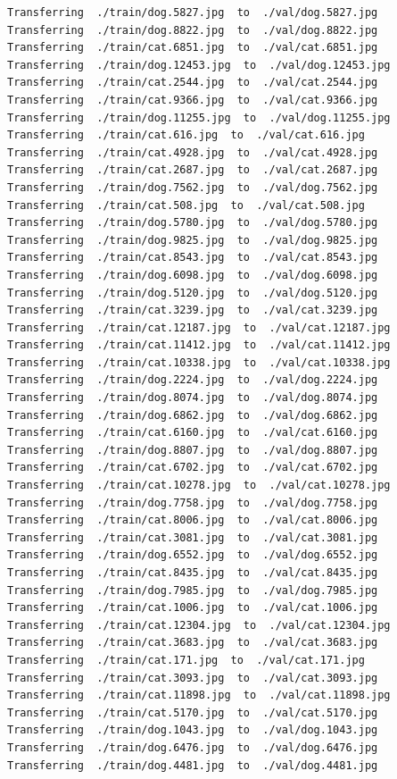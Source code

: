 \documentclass[]{book}
\theoremstyle{definition}
\theoremstyle{definition}
\theoremstyle{definition}
\theoremstyle{remark}
\begin{document}
\begin{verbatim}
Transferring  ./train/dog.5827.jpg  to  ./val/dog.5827.jpg
Transferring  ./train/dog.8822.jpg  to  ./val/dog.8822.jpg
Transferring  ./train/cat.6851.jpg  to  ./val/cat.6851.jpg
Transferring  ./train/dog.12453.jpg  to  ./val/dog.12453.jpg
Transferring  ./train/cat.2544.jpg  to  ./val/cat.2544.jpg
Transferring  ./train/cat.9366.jpg  to  ./val/cat.9366.jpg
Transferring  ./train/dog.11255.jpg  to  ./val/dog.11255.jpg
Transferring  ./train/cat.616.jpg  to  ./val/cat.616.jpg
Transferring  ./train/cat.4928.jpg  to  ./val/cat.4928.jpg
Transferring  ./train/cat.2687.jpg  to  ./val/cat.2687.jpg
Transferring  ./train/dog.7562.jpg  to  ./val/dog.7562.jpg
Transferring  ./train/cat.508.jpg  to  ./val/cat.508.jpg
Transferring  ./train/dog.5780.jpg  to  ./val/dog.5780.jpg
Transferring  ./train/dog.9825.jpg  to  ./val/dog.9825.jpg
Transferring  ./train/cat.8543.jpg  to  ./val/cat.8543.jpg
Transferring  ./train/dog.6098.jpg  to  ./val/dog.6098.jpg
Transferring  ./train/dog.5120.jpg  to  ./val/dog.5120.jpg
Transferring  ./train/cat.3239.jpg  to  ./val/cat.3239.jpg
Transferring  ./train/cat.12187.jpg  to  ./val/cat.12187.jpg
Transferring  ./train/cat.11412.jpg  to  ./val/cat.11412.jpg
Transferring  ./train/cat.10338.jpg  to  ./val/cat.10338.jpg
Transferring  ./train/dog.2224.jpg  to  ./val/dog.2224.jpg
Transferring  ./train/dog.8074.jpg  to  ./val/dog.8074.jpg
Transferring  ./train/dog.6862.jpg  to  ./val/dog.6862.jpg
Transferring  ./train/cat.6160.jpg  to  ./val/cat.6160.jpg
Transferring  ./train/dog.8807.jpg  to  ./val/dog.8807.jpg
Transferring  ./train/cat.6702.jpg  to  ./val/cat.6702.jpg
Transferring  ./train/cat.10278.jpg  to  ./val/cat.10278.jpg
Transferring  ./train/dog.7758.jpg  to  ./val/dog.7758.jpg
Transferring  ./train/cat.8006.jpg  to  ./val/cat.8006.jpg
Transferring  ./train/cat.3081.jpg  to  ./val/cat.3081.jpg
Transferring  ./train/dog.6552.jpg  to  ./val/dog.6552.jpg
Transferring  ./train/cat.8435.jpg  to  ./val/cat.8435.jpg
Transferring  ./train/dog.7985.jpg  to  ./val/dog.7985.jpg
Transferring  ./train/cat.1006.jpg  to  ./val/cat.1006.jpg
Transferring  ./train/cat.12304.jpg  to  ./val/cat.12304.jpg
Transferring  ./train/cat.3683.jpg  to  ./val/cat.3683.jpg
Transferring  ./train/cat.171.jpg  to  ./val/cat.171.jpg
Transferring  ./train/cat.3093.jpg  to  ./val/cat.3093.jpg
Transferring  ./train/cat.11898.jpg  to  ./val/cat.11898.jpg
Transferring  ./train/cat.5170.jpg  to  ./val/cat.5170.jpg
Transferring  ./train/dog.1043.jpg  to  ./val/dog.1043.jpg
Transferring  ./train/dog.6476.jpg  to  ./val/dog.6476.jpg
Transferring  ./train/dog.4481.jpg  to  ./val/dog.4481.jpg

\end{verbatim}
\end{document}
